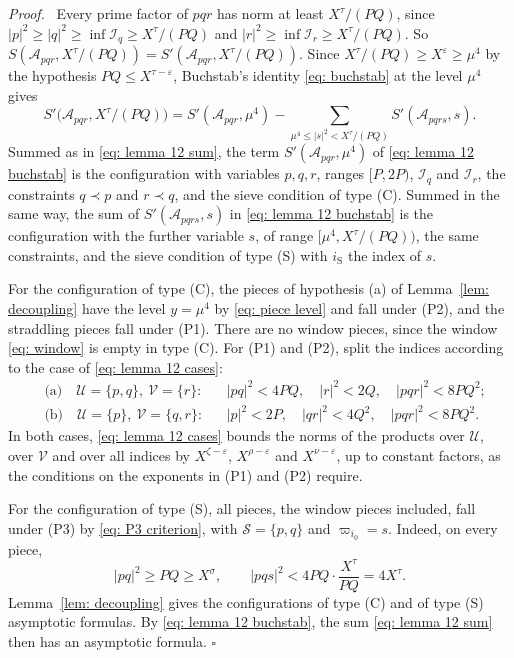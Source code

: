 \documentclass{article}
\numberwithin{equation}{section}
\newenvironment{proof}[1][Proof]{\par\medskip\noindent\textit{#1.}\ }{\hfill$\square$\par\medskip}
\newcommand{\Le}{\leqslant}
\newcommand{\Ge}{\geqslant}
\begin{document}
\begin{proof}
Every prime factor of $pqr$ has norm at least $X^{\tau}/(PQ)$, since $|p|^2 \Ge |q|^2 \Ge \inf \mathcal{I}_q \Ge X^{\tau}/(PQ)$ and $|r|^2 \Ge \inf \mathcal{I}_r \Ge X^{\tau}/(PQ)$. So $S(\mathcal{A}_{pqr}, X^{\tau}/(PQ)) = S'(\mathcal{A}_{pqr}, X^{\tau}/(PQ))$. Since $X^{\tau}/(PQ) \Ge X^{\varepsilon} \Ge \mu^4$ by the hypothesis $PQ \Le X^{\tau - \varepsilon}$, Buchstab's identity \eqref{eq: buchstab} at the level $\mu^4$ gives
\begin{equation}
\label{eq: lemma 12 buchstab}
S'\bigl(\mathcal{A}_{pqr}, X^{\tau}/(PQ)\bigr) = S'(\mathcal{A}_{pqr}, \mu^4) - \sum_{\mu^4 \Le |s|^2 < X^{\tau}/(PQ)} S'(\mathcal{A}_{pqrs}, s).
\end{equation}
Summed as in \eqref{eq: lemma 12 sum}, the term $S'(\mathcal{A}_{pqr}, \mu^4)$ of \eqref{eq: lemma 12 buchstab} is the configuration with variables $p, q, r$, ranges $[P, 2P)$, $\mathcal{I}_q$ and $\mathcal{I}_r$, the constraints $q \prec p$ and $r \prec q$, and the sieve condition of type (C). Summed in the same way, the sum of $S'(\mathcal{A}_{pqrs}, s)$ in \eqref{eq: lemma 12 buchstab} is the configuration with the further variable $s$, of range $[\mu^4, X^{\tau}/(PQ))$, the same constraints, and the sieve condition of type (S) with $i_{\mathrm{S}}$ the index of $s$.

For the configuration of type (C), the pieces of hypothesis (a) of Lemma~\ref{lem: decoupling} have the level $y = \mu^4$ by \eqref{eq: piece level} and fall under (P2), and the straddling pieces fall under (P1). There are no window pieces, since the window \eqref{eq: window} is empty in type (C). For (P1) and (P2), split the indices according to the case of \eqref{eq: lemma 12 cases}:
\begin{equation*}
\begin{aligned}
&\text{(a)}\quad \mathcal{U} = \{p, q\},\ \mathcal{V} = \{r\}: && |pq|^2 < 4PQ, \quad |r|^2 < 2Q, \quad |pqr|^2 < 8PQ^2; \\
&\text{(b)}\quad \mathcal{U} = \{p\},\ \mathcal{V} = \{q, r\}: && |p|^2 < 2P, \quad |qr|^2 < 4Q^2, \quad |pqr|^2 < 8PQ^2.
\end{aligned}
\end{equation*}
In both cases, \eqref{eq: lemma 12 cases} bounds the norms of the products over $\mathcal{U}$, over $\mathcal{V}$ and over all indices by $X^{\zeta - \varepsilon}$, $X^{\rho - \varepsilon}$ and $X^{\nu - \varepsilon}$, up to constant factors, as the conditions on the exponents in (P1) and (P2) require.

For the configuration of type (S), all pieces, the window pieces included, fall under (P3) by \eqref{eq: P3 criterion}, with $\mathcal{S} = \{p, q\}$ and $\varpi_{i_0} = s$. Indeed, on every piece,
\begin{equation*}
|pq|^2 \Ge PQ \Ge X^{\sigma}, \qquad |pqs|^2 < 4PQ \cdot \frac{X^{\tau}}{PQ} = 4X^{\tau}.
\end{equation*}
Lemma~\ref{lem: decoupling} gives the configurations of type (C) and of type (S) asymptotic formulas. By \eqref{eq: lemma 12 buchstab}, the sum \eqref{eq: lemma 12 sum} then has an asymptotic formula.
\end{proof}
\end{document}
